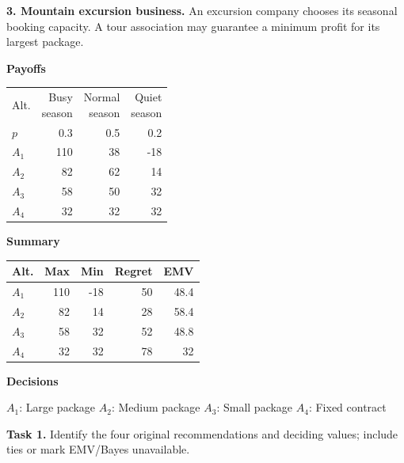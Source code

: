 \begin{studentproblem}
\textbf{3. Mountain excursion business.} An excursion company chooses its seasonal booking capacity. A tour association may guarantee a minimum profit for its largest package.
\begin{center}
	\begingroup
	\normalsize
	\setlength{\tabcolsep}{2.5pt}
	\renewcommand{\arraystretch}{1.1}
	
	\begin{minipage}[t]{0.31\linewidth}
		\centering
		\textbf{Payoffs}\par\vspace{2pt}
		\begin{tabular}{@{}lrrr@{}}\toprule Alt. & \shortstack{Busy\\season} & \shortstack{Normal\\season} & \shortstack{Quiet\\season}\\
$p$ & 0.3 & 0.5 & 0.2\\
\midrule
$A_1$ & 110 & 38 & -18\\
$A_2$ & 82 & 62 & 14\\
$A_3$ & 58 & 50 & 32\\
$A_4$ & 32 & 32 & 32\\
\bottomrule\end{tabular}
	\end{minipage}%
	\hfill
	\begin{minipage}[t]{0.33\linewidth}
		\centering
		\textbf{Summary}\par\vspace{2pt}
		\begin{tabular}{@{}lrrrr@{}}\toprule Alt. & Max & Min & Regret & EMV\\\midrule
$A_1$ & 110 & -18 & 50 & 48.4\\
$A_2$ & 82 & 14 & 28 & 58.4\\
$A_3$ & 58 & 32 & 52 & 48.8\\
$A_4$ & 32 & 32 & 78 & 32\\
\bottomrule\end{tabular}
	\end{minipage}%
	\hfill
	\begin{minipage}[t]{0.32\linewidth}
		\centering
		\textbf{Decisions}\par\vspace{2pt}
		\choices
	\end{minipage}
	
	\vspace{2mm}
	\footnotesize
	$A_1$: Large package \quad
	$A_2$: Medium package \quad
	$A_3$: Small package \quad
	$A_4$: Fixed contract
	\endgroup
\end{center}
\textbf{Task 1.} Identify the four original recommendations and deciding values; include ties or mark EMV/Bayes unavailable.


\end{studentproblem}
